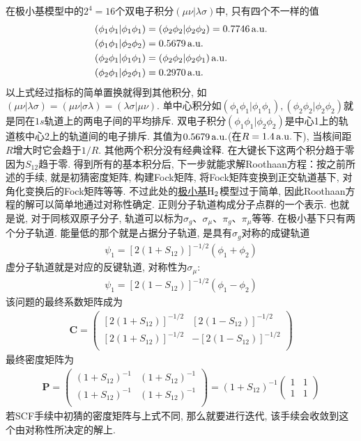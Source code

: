 在极小基模型中的$2^4=16$个双电子积分$(\mu\nu|\lambda\sigma)$中, 
只有四个不一样的值
\begin{equation}
	\begin{split}
		(\phi_1\phi_1|\phi_1\phi_1) & = (\phi_2\phi_2|\phi_2\phi_2) = 0.7746\,\mathrm{a.u.}\\
		(\phi_1\phi_1|\phi_2\phi_2) & =0.5679\,\mathrm{a.u.}\\
		(\phi_2\phi_1|\phi_1\phi_1) & =(\phi_2\phi_2|\phi_2\phi_1)\,\mathrm{a.u.}\\
		(\phi_2\phi_1|\phi_2\phi_1) & =0.2970\,\mathrm{a.u.}
	\end{split}
\end{equation}
以上式经过指标的简单置换就得到其他积分, 
如$(\mu\nu|\lambda\sigma)=(\mu\nu|\sigma\lambda)=(\lambda\sigma|\mu\nu)$. 
单中心积分如$(\phi_1\phi_1|\phi_1\phi_1),(\phi_2\phi_2|\phi_2\phi_2)$就是同在$1s$轨道上的两电子间的平均排斥. 
双电子积分$(\phi_1\phi_1|\phi_2\phi_2)$是中心1上的轨道核中心2上的轨道间的电子排斥. 
其值为$0.5679\,\mathrm{a.u.}$(在$R=1.4\,\mathrm{a.u.}$下), 
当核间距$R$增大时它会趋于$1/R$. 
其他两个积分没有经典诠释. 
在大键长下这两个积分趋于零因为$S_{12}$趋于零. 
得到所有的基本积分后, 
下一步就能求解Roothaan方程：按之前所述的手续, 
就是初猜密度矩阵, 
构建Fock矩阵, 
将Fock矩阵变换到正交轨道基下, 
对角化变换后的Fock矩阵等等. 
不过此处的\underline{极小基$\mathrm{H}_2$}模型过于简单, 
因此Roothaan方程的解可以简单地通过对称性确定. 
正则分子轨道构成分子点群的一个表示. 
也就是说, 
对于同核双原子分子, 
轨道可以标为$\sigma_g$、$\sigma_\mu$、$\pi_g$、$\pi_\mu$等等. 
在极小基下只有两个分子轨道. 
能量低的那个就是占据分子轨道, 
是具有$\sigma_g$对称的成键轨道
\begin{align}
	\psi_1 = [2(1+S_{12})]^{-1/2}(\phi_1+\phi_2)
\end{align}
虚分子轨道就是对应的反键轨道, 
对称性为$\sigma_\mu$:
\begin{align}
	\psi_1 = [2(1-S_{12})]^{-1/2}(\phi_1-\phi_2)
\end{align}
该问题的最终系数矩阵成为
\begin{align}
	\mathbf{C}=
	\begin{pmatrix}
		[2(1+S_{12})]^{-1/2} & [2(1-S_{12})]^{-1/2}\\
		[2(1+S_{12})]^{-1/2} & -[2(1-S_{12})]^{-1/2}\\
	\end{pmatrix}
\end{align}
最终密度矩阵为
\begin{align}
	\mathbf{P}=
	\begin{pmatrix}
		(1+S_{12})^{-1} & (1+S_{12})^{-1} \\
		(1+S_{12})^{-1} & (1+S_{12})^{-1} \\
	\end{pmatrix}
	=(1+S_{12})^{-1} 
	\begin{pmatrix}
		1&1\\1&1
	\end{pmatrix}
\end{align}
若SCF手续中初猜的密度矩阵与上式不同, 
那么就要进行迭代, 
该手续会收敛到这个由对称性所决定的解上.

